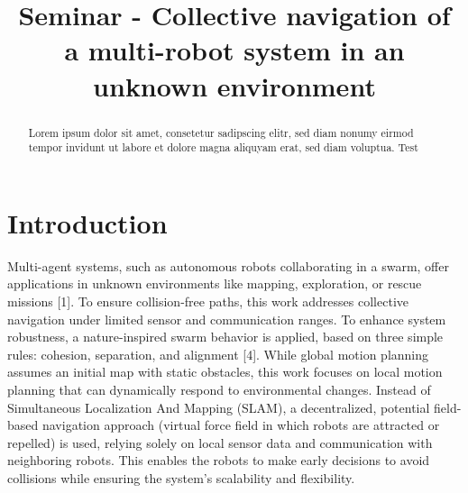 \documentclass[conference]{IEEEtran}
\begin{document}
\title{Seminar - Collective navigation of a multi-robot system in an unknown environment}
\author{
}

\maketitle


\begin{abstract}
Lorem ipsum dolor sit amet, consetetur sadipscing elitr, sed diam nonumy eirmod tempor invidunt ut labore et dolore magna aliquyam erat, sed diam voluptua.
Test \cite{Olcay.2020}
\end{abstract}

\section{Introduction}
Multi-agent systems, such as autonomous robots collaborating in a swarm, offer applications in unknown environments like mapping, exploration, or rescue missions [1]. To ensure collision-free paths, this work addresses collective navigation under limited sensor and communication ranges. To enhance system robustness, a nature-inspired swarm behavior is applied, based on three simple rules: cohesion, separation, and alignment [4]. While global motion planning assumes an initial map with static obstacles, this work focuses on local motion planning that can dynamically respond to environmental changes. Instead of Simultaneous Localization And Mapping (SLAM), a decentralized, potential field-based navigation approach (virtual force field in which robots are attracted or repelled) is used, relying solely on local sensor data and communication with neighboring robots. This enables the robots to make early decisions to avoid collisions while ensuring the system's scalability and flexibility.
\end{document}
